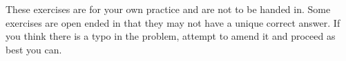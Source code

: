 \documentclass{article}
\newcommand{\enterProblemHeader}[1]{
\nobreak\extramarks{#1}{#1 continued on next page\ldots}\nobreak
\nobreak\extramarks{#1 (continued)}{#1 continued on next page\ldots}\nobreak
}
\newcommand{\exitProblemHeader}[1]{
\nobreak\extramarks{#1 (continued)}{#1 continued on next page\ldots}\nobreak
\nobreak\extramarks{#1}{}\nobreak
}
\newcounter{homeworkProblemCounter} %
\newcommand{\homeworkProblemName}{}
\newenvironment{ex}[1][Problem \arabic{homeworkProblemCounter}]{ %
\stepcounter{homeworkProblemCounter} %
\renewcommand{\homeworkProblemName}{#1} %
\section{\homeworkProblemName} %
}{
}
\newif\ifsolutions
\begin{document}
	
	
	\ifsolutions
	\begin{center}
		
		{\Huge Problem Set for Lectures 1-2(a)
			(with Solutions)}
	\end{center}
	
	\fi
	
These exercises are for your own practice and are not to be handed in. Some exercises are open ended in that they may not have a unique correct answer. If you think there is a typo in the problem, attempt to amend it and proceed as best you can.

%	
\end{document}
